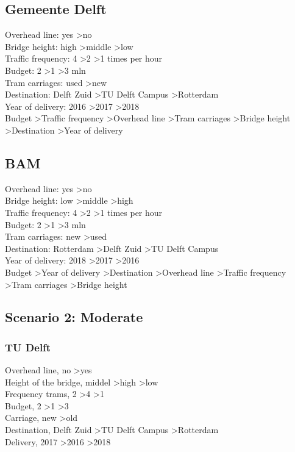 \documentclass{article}
\begin{document}
\subsection{Gemeente Delft}
Overhead line: yes \textgreater no \\
Bridge height: high \textgreater middle \textgreater low \\
Traffic frequency: 4 \textgreater 2 \textgreater 1 times per hour \\
Budget: 2 \textgreater 1 \textgreater 3 mln \\
Tram carriages: used \textgreater new \\
Destination: Delft Zuid \textgreater TU Delft Campus \textgreater Rotterdam \\
Year of delivery: 2016 \textgreater 2017 \textgreater 2018 \\

Budget \textgreater Traffic frequency \textgreater Overhead line \textgreater Tram carriages \textgreater Bridge height \textgreater Destination \textgreater Year of delivery

\subsection{BAM}
Overhead line: yes \textgreater no \\
Bridge height: low \textgreater middle \textgreater high \\
Traffic frequency: 4 \textgreater 2 \textgreater 1 times per hour \\
Budget: 2 \textgreater 1 \textgreater 3 mln \\
Tram carriages: new \textgreater used \\
Destination: Rotterdam \textgreater Delft Zuid \textgreater TU Delft Campus \\
Year of delivery: 2018 \textgreater 2017 \textgreater 2016 \\

Budget \textgreater Year of delivery \textgreater Destination \textgreater Overhead line \textgreater Traffic frequency \textgreater Tram carriages \textgreater Bridge height\\

\subsection{Scenario 2: Moderate}

\subsubsection*{TU Delft}
Overhead line, no \textgreater yes \\
Height of the bridge, middel  \textgreater high \textgreater low \\
Frequency trams, 2 \textgreater 4 \textgreater 1 \\
Budget, 2 \textgreater 1 \textgreater 3 \\
Carriage, new \textgreater old \\
Destination, Delft Zuid \textgreater TU Delft Campus \textgreater Rotterdam \\
Delivery, 2017 \textgreater 2016 \textgreater 2018 \\
\end{document}
